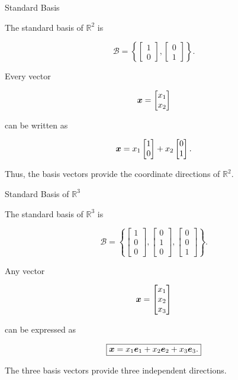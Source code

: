 \begin{frame}{Standard Basis}

The standard basis of $\mathbb{R}^2$ is

\[
\boxed{
\mathcal{B}
=
\left\{
\begin{bmatrix}
1\\
0
\end{bmatrix},
\begin{bmatrix}
0\\
1
\end{bmatrix}
\right\}.
}
\]

Every vector

\[
\bm{x}
=
\begin{bmatrix}
x_1\\
x_2
\end{bmatrix}
\]

can be written as

\[
\bm{x}
=
x_1
\begin{bmatrix}
1\\
0
\end{bmatrix}
+
x_2
\begin{bmatrix}
0\\
1
\end{bmatrix}.
\]

\vspace{0.3cm}

Thus, the basis vectors provide the coordinate directions of
$\mathbb{R}^2$.

\end{frame}



\begin{frame}{Standard Basis of $\mathbb{R}^3$}

The standard basis of $\mathbb{R}^3$ is

\[
\mathcal{B}
=
\left\{
\begin{bmatrix}
1\\0\\0
\end{bmatrix},
\begin{bmatrix}
0\\1\\0
\end{bmatrix},
\begin{bmatrix}
0\\0\\1
\end{bmatrix}
\right\}.
\]

Any vector

\[
\bm{x}
=
\begin{bmatrix}
x_1\\x_2\\x_3
\end{bmatrix}
\]

can be expressed as

\[
\boxed{
\bm{x}
=
x_1\bm{e}_1
+
x_2\bm{e}_2
+
x_3\bm{e}_3.
}
\]

The three basis vectors provide three independent directions.

\end{frame}



